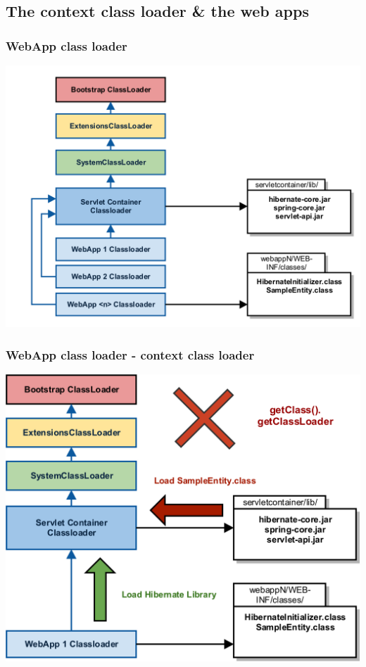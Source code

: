 \documentclass[aspectratio=169]{beamer}
\begin{document}
	\subsection{The context class loader \& the web apps}
	\begin{frame}
		\frametitle{WebApp class loader}
		\begin{center}
			\includegraphics[scale=0.1]{assets/contextclassloader/webappclassloader-1.png} 
		\end{center}
	\end{frame}
	\begin{frame}
		\frametitle{WebApp class loader - context class loader}
		\begin{center}
			\includegraphics[scale=0.1]{assets/contextclassloader/webappclassloader-2.png} 
		\end{center}
	\end{frame}
\end{document}
